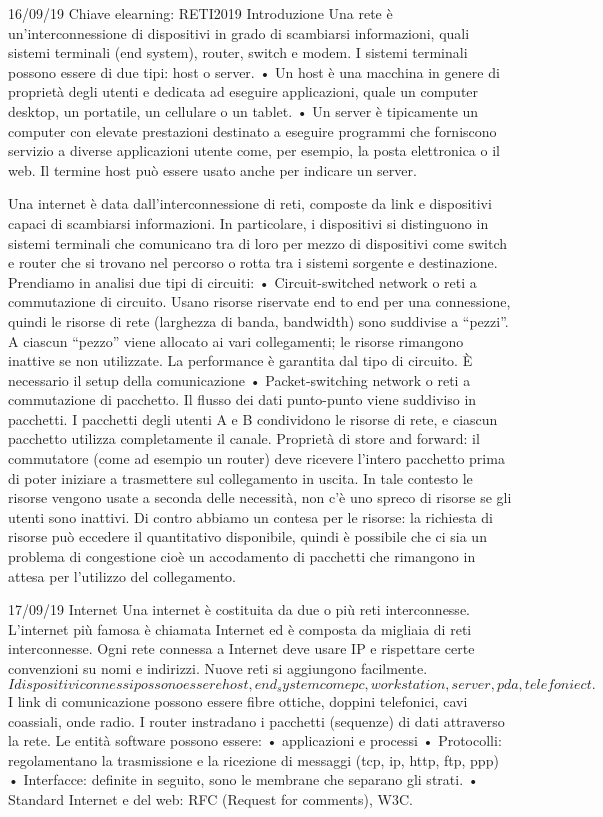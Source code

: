 \documentclass[10pt]{article}
\begin{document}
16/09/19
Chiave elearning: RETI2019
Introduzione
Una rete è un’interconnessione di dispositivi in grado di scambiarsi informazioni, quali sistemi terminali (end system), router, switch e modem.
I sistemi terminali possono essere di due tipi: host o server.
    • Un host è una macchina in genere di proprietà degli utenti e dedicata ad eseguire applicazioni, quale un computer desktop, un portatile, un cellulare o un tablet.
    • Un server è tipicamente un computer con elevate prestazioni destinato a eseguire programmi che forniscono servizio a diverse applicazioni utente come, per esempio, la posta elettronica o il web.
Il termine host può essere usato anche per indicare un server.

Una internet è data dall’interconnessione di reti, composte da link e dispositivi capaci di scambiarsi informazioni.
In particolare, i dispositivi si distinguono in sistemi terminali che comunicano tra di loro per mezzo di dispositivi come switch e router che si trovano nel percorso o rotta tra i sistemi sorgente e destinazione. Prendiamo in analisi due tipi di circuiti:
    • Circuit-switched network o reti a commutazione di circuito.
      Usano risorse riservate end to end per una connessione, quindi le risorse di rete (larghezza di banda, bandwidth) sono suddivise a “pezzi”. A ciascun “pezzo” viene allocato ai vari collegamenti; le risorse rimangono inattive se non utilizzate. La performance è garantita dal tipo di circuito. È necessario il setup della comunicazione
    • Packet-switching network o reti a commutazione di pacchetto.
      Il flusso dei dati punto-punto viene suddiviso in pacchetti. I pacchetti degli utenti A e B condividono le risorse di rete, e ciascun pacchetto utilizza completamente il canale.
      Proprietà di store and forward: il commutatore (come ad esempio un router) deve ricevere l’intero pacchetto prima di poter iniziare a trasmettere sul collegamento in uscita.
      In tale contesto le risorse vengono usate a seconda delle necessità, non c’è uno spreco di risorse se gli utenti sono inattivi. Di contro abbiamo un contesa per le risorse: la richiesta di risorse può eccedere il quantitativo disponibile, quindi è possibile che ci sia un problema di congestione cioè un accodamento di pacchetti che rimangono in attesa per l’utilizzo del collegamento.
      

17/09/19
Internet
Una internet è costituita da due o più reti interconnesse.
L’internet più famosa è chiamata Internet ed è composta da migliaia di reti interconnesse.
Ogni rete connessa a Internet deve usare IP e rispettare certe convenzioni su nomi e indirizzi. Nuove reti si aggiungono facilmente.
$I dispositivi connessi possono essere host, end_system come pc, workstation, server, pda, telefoni ect.$
I link di comunicazione possono essere fibre ottiche, doppini telefonici, cavi coassiali, onde radio.
I router instradano i pacchetti (sequenze) di dati attraverso la rete.
Le entità software possono essere:
    • applicazioni e processi
    • Protocolli: regolamentano la trasmissione e la ricezione di messaggi (tcp, ip, http, ftp, ppp)
    • Interfacce: definite in seguito, sono le membrane che separano gli strati.
    • Standard Internet e del web: RFC (Request for comments), W3C.
\end{document}
